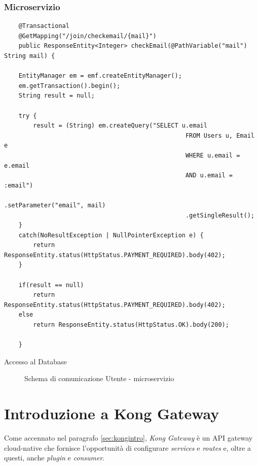 \subsubsection{Microservizio}

\begin{algorithm}
\centering
\begin{verbatim}
	@Transactional
	@GetMapping("/join/checkemail/{mail}")
	public ResponseEntity<Integer> checkEmail(@PathVariable("mail") String mail) {

	EntityManager em = emf.createEntityManager();
	em.getTransaction().begin();
	String result = null;

	try {
		result = (String) em.createQuery("SELECT u.email
                                                  FROM Users u, Email e
                                                  WHERE u.email = e.email 
                                                  AND u.email = :email")
                                                  .setParameter("email", mail)
                                                  .getSingleResult();
	}
	catch(NoResultException | NullPointerException e) {
		return ResponseEntity.status(HttpStatus.PAYMENT_REQUIRED).body(402);
	}

	if(result == null)
		return ResponseEntity.status(HttpStatus.PAYMENT_REQUIRED).body(402);
	else
		return ResponseEntity.status(HttpStatus.OK).body(200);

	}
\end{verbatim}
\caption{Accesso al Database}
\end{algorithm}

\begin{figure}[ht]
	\centering
	\caption{Schema di comunicazione Utente - microservizio}
	\label{fig:one}
\end{figure}

\section{Introduzione a Kong Gateway}\label{sec:kongprog}
Come accennato nel paragrafo \ref{sec:kongintro}, \emph{Kong Gateway} è un API gateway cloud-native che fornisce l’opportunità di configurare \emph{services} e \emph{routes} e, oltre a questi, anche \emph{plugin} e \emph{consumer}.
